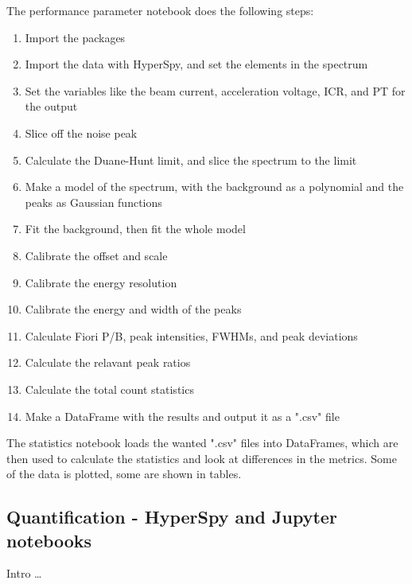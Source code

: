 The performance parameter notebook does the following steps:

\begin{enumerate}
    \item Import the packages
    \item Import the data with HyperSpy, and set the elements in the spectrum
    \item Set the variables like the beam current, acceleration voltage, ICR, and PT for the output
    \item Slice off the noise peak
    \item Calculate the Duane-Hunt limit, and slice the spectrum to the limit
    \item Make a model of the spectrum, with the background as a polynomial and the peaks as Gaussian functions
    \item Fit the background, then fit the whole model
    \item Calibrate the offset and scale
    \item Calibrate the energy resolution
    \item Calibrate the energy and width of the peaks
    \item Calculate Fiori P/B, peak intensities, FWHMs, and peak deviations
    \item Calculate the relavant peak ratios
    \item Calculate the total count statistics
    \item Make a DataFrame with the results and output it as a ".csv" file
\end{enumerate}


The statistics notebook loads the wanted ".csv" files into DataFrames, which are then used to calculate the statistics and look at differences in the metrics.
Some of the data is plotted, some are shown in tables.


























\subsection{Quantification - HyperSpy and Jupyter notebooks}
\label{method:data_treatment:quantification}


Intro \dots



